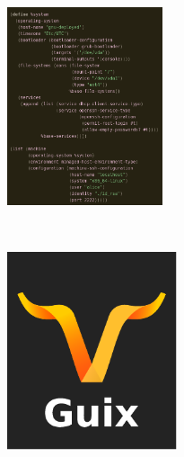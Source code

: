 \documentclass[bigger]{beamer}
\begin{document}
\begin{frame}[label={sec:org4dc12ed}]{⁤}
\begin{center}
\includegraphics[height=220]{./Deploy.png}
\end{center}
\end{frame}
\begin{frame}[label={sec:orgd7fc342}]{⁤}
\begin{center}
\includegraphics[height=220]{./Guix Logo.pdf}
\end{center}
\end{frame}
\end{document}
